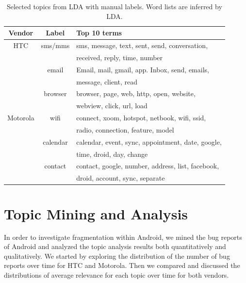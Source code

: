 \documentclass[10pt, conference, compsocconf]{IEEEtran}
\begin{document}
\begin{table}[!t]
\renewcommand{\arraystretch}{1.3}
\caption{Selected topics from LDA with manual labels. Word lists are inferred by LDA.}
\label{seleted2}
\centering
\begin{tabular}{|c||c||l|}
\hline
Vendor & Label & Top 10 terms\\
\hline
HTC & sms\//mms &sms, message, text, sent, send, conversation, \\
            && received, reply, time, number \\ \cline{2-3}
  & email & Email, mail, gmail, app. Inbox, send, emails, \\
            &&message, client, read \\ \cline{2-3}
  & browser&browser, page, web, http, open, website, \\
            &&webview, click, url, load\\
\hline
Motorola & wifi &connect, xoom, hotspot, netbook, wifi, ssid, \\
           &&radio, connection, feature, model\\ \cline{2-3}
    &calendar& calendar, event, sync, appointment, date, google, \\
           &&time, droid, day, change \\ \cline{2-3}
    &contact & contact, google, number, address, list, facebook, \\
           &&droid, account, sync, separate \\
\hline
\end{tabular}
\end{table}


\section{Topic Mining and Analysis}
\label{sec:topicanalysis}

In order to investigate fragmentation within Android, we mined the bug
reports of Android and analyzed the topic analysis results both
quantitatively and qualitatively.
We started by exploring the distribution of the number of bug reports
over time for HTC and Motorola. Then we compared and discussed the
distributions of average relevance for each topic over time for both
vendors.
\end{document}
